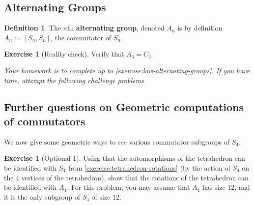 \documentclass[reqno, 12pt, letter]{article}
\theoremstyle{plain}
\theoremstyle{definition}
\newtheorem{definition}[theorem]{Definition}
\newtheorem{exercise}[theorem]{Exercise}
\theoremstyle{remark}
\numberwithin{equation}{section}
\begin{document}

\subsection{Alternating Groups}

\begin{definition}
	\label{definition:alternating}
	The $n$th {\bf alternating group}, denoted $A_n$ is by definition $A_n := \left[ S_n, S_n \right]$, the commutator of $S_n$.
\end{definition}
\begin{exercise}[Reality check]
	\label{exercise:low-alternating-groups}
	Verify that $A_3 = C_3$.	
\end{exercise}

{\it Your homework is to complete up to \autoref{exercise:low-alternating-groups}. If you have time, attempt the following challenge
problems}

\subsection{Further questions on Geometric computations of commutators}
We now give some geometric ways to see various commutator subgroups of $S_4$.
\begin{exercise}[Optional 1]
	\label{exercise:}
	Using that the automorphisms of the tetrahedron can be identified with $S_4$ from \autoref{exercise:tetrahedron-rotations} (by the action of
	$S_4$ on the $4$ vertices of the tetrahedron), 
	show that the rotations of the tetrahedron can be identified with $A_4$. For this problem, you may assume that $A_4$ has size $12$, and
		it is the only subgroup of $S_4$ of size $12$.
\end{exercise}
\end{document}
